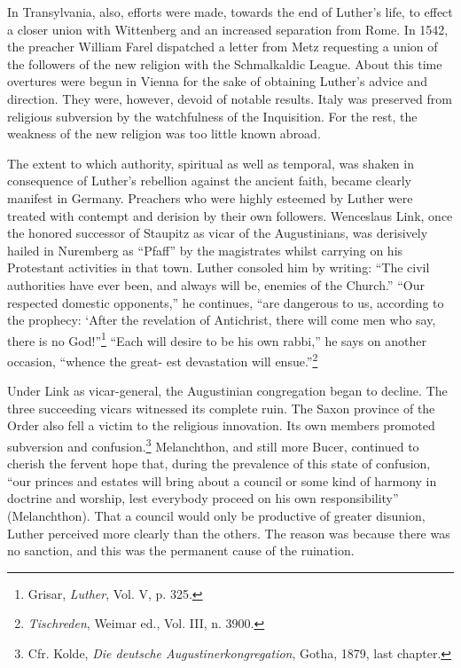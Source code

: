 In Transylvania, also, efforts were made, towards the end of Luther’s
life, to effect a closer union with Wittenberg and an increased
separation from Rome. In 1542, the preacher William Farel dispatched a
letter from Metz requesting a union of the followers of the
new religion with the Schmalkaldic League. About this time overtures
were begun in Vienna for the sake of obtaining Luther’s advice and
direction. They were, however, devoid of notable results. Italy was
preserved from religious subversion by the watchfulness of the Inquisition.
For the rest, the weakness of the new religion was too little
known abroad.

The extent to which authority, spiritual as well as temporal, was
shaken in consequence of Luther’s rebellion against the ancient faith,
became clearly manifest in Germany. Preachers who were highly
esteemed by Luther were treated with contempt and derision by their
own followers. Wenceslaus Link, once the honored successor of Staupitz
as vicar of the Augustinians, was derisively hailed in Nuremberg
as “Pfaff” by the magistrates whilst carrying on his Protestant activities
in that town. Luther consoled him by writing: “The civil authorities have
ever been, and always will be, enemies of the Church.”
“Our respected domestic opponents,” he continues, “are dangerous
to us, according to the prophecy: ‘After the revelation of Antichrist,
there will come men who say, there is no God!”\footnote{Grisar, \textit{Luther}, Vol. V, p. 325.}
“Each will desire
to be his own rabbi,” he says on another occasion, “whence the great-
est devastation will ensue.”\footnote{\textit{Tischreden}, Weimar ed., Vol. III, n. 3900.}

Under Link as vicar-general, the Augustinian congregation began
to decline. The three succeeding vicars witnessed its complete
ruin. The Saxon province of the Order also fell a victim to the religious
innovation. Its own members promoted subversion and confusion.\footnote{Cfr. Kolde, \textit{Die deutsche Augustinerkongregation}, Gotha, 1879, last chapter.}
Melanchthon, and still more Bucer, continued to cherish the
fervent hope that, during the prevalence of this state of confusion,
“our princes and estates will bring about a council or some kind of
harmony in doctrine and worship, lest everybody proceed on his own
responsibility” (Melanchthon). That a council would only be productive
of greater disunion, Luther perceived more clearly than the
others. The reason was because there was no sanction, and this was
the permanent cause of the ruination.

